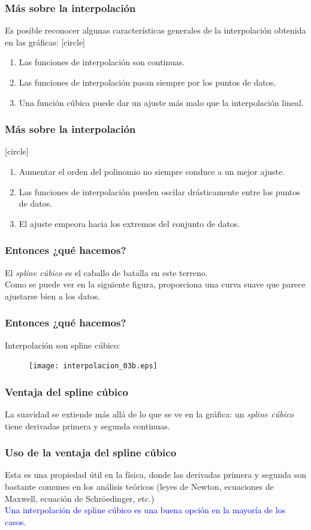 \begin{frame}
\frametitle{Más sobre la interpolación}
Es posible reconocer algunas características generales de la interpolación obtenida en las gráficas:
[circle]
\begin{enumerate}[<+->]
\item Las funciones de interpolación son continuas.
\item Las funciones de interpolación pasan siempre por los puntos de datos.
\item Una función cúbica puede dar un ajuste más malo que la interpolación lineal.
\seti
\end{enumerate}
\end{frame}
\begin{frame}
\frametitle{Más sobre la interpolación}
[circle]
\begin{enumerate}[<+->]
\conti
\item Aumentar el orden del polinomio no siempre conduce a un mejor ajuste.
\item Las funciones de interpolación pueden oscilar drásticamente entre los puntos de datos.
\item El ajuste empeora hacia los extremos del conjunto de datos.
\end{enumerate}
\end{frame}
\begin{frame}
\frametitle{Entonces ¿qué hacemos?}
El \emph{spline cúbico} es el caballo de batalla en este terreno. 
\\
\bigskip
Como se puede ver en la siguiente figura, proporciona una curva suave que parece ajustarse bien a los datos.
\end{frame}
\begin{frame}
\frametitle{Entonces ¿qué hacemos?}
Interpolación son spline cúbico:
\begin{figure}
\centering
\texttt{[image: interpolacion\_03b.eps]}
\end{figure}
\end{frame}
\begin{frame}
\frametitle{Ventaja del spline cúbico}
La suavidad se extiende más allá de lo que se ve en la gráfica: un \emph{spline cúbico} tiene derivadas primera y segunda continuas.
\end{frame}
\begin{frame}
\frametitle{Uso de la ventaja del spline cúbico}
Esta es una propiedad útil en la física, donde las derivadas primera y segunda son bastante comunes en los análisis teóricos (leyes de Newton, ecuaciones de Maxwell, ecuación de Schröedinger, etc.)
\\
\medskip
\pause
\textcolor{blue}{Una interpolación de spline cúbico es una buena opción en la mayoría de los casos}.
\end{frame}
